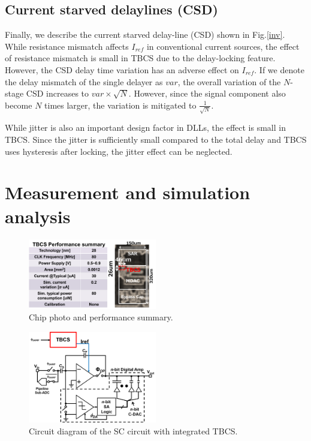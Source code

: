 \documentclass[paper]{ieice}
\begin{document}
\subsection{Current starved delaylines (CSD)}

\qquad Finally, we describe the current starved delay-line (CSD) shown in Fig.\ref{inv}. While resistance mismatch affects $I_{ref}$ in conventional current sources, the effect of resistance mismatch is small in TBCS due to the delay-locking feature. However, the CSD delay time variation has an adverse effect on $I_{ref}$.
If we denote the delay mismatch of the single delayer as $var$, the overall variation of the $N$-stage CSD increases to $var \times \sqrt{N}$. However, since the signal component also become  $N$ times larger, the variation is mitigated to $\frac{1}{\sqrt{N}}$.

While jitter is also an important design factor in DLLs, the effect is small in TBCS. Since the jitter is sufficiently small compared to the total delay and TBCS uses hysteresis after locking, the jitter effect can be neglected.

\section{Measurement and simulation analysis}
\begin{figure}[!t]
\centering
 \includegraphics[width=0.5\textwidth]{figs/chip.png}
  \caption{Chip photo and performance summary.}
\label{chip}
\end{figure}

\begin{figure}[!t]
\centering
 \includegraphics[width=0.5\textwidth]{figs/switchcap.png}
  \caption{Circuit diagram of the SC circuit with integrated TBCS.}
\label{scap}
\end{figure}
\end{document}
